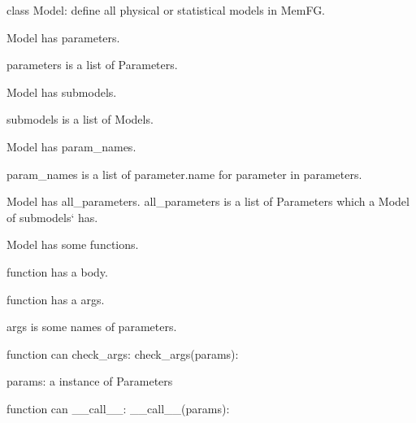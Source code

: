 \begin{DoxyItemize}
\item class {\ttfamily Model}\+: define all physical or statistical models in Mem\+FG.
\begin{DoxyItemize}
\item {\ttfamily Model} has {\ttfamily parameters}.
\begin{DoxyItemize}
\item {\ttfamily parameters} is a {\ttfamily list} of {\ttfamily Parameter}s.
\end{DoxyItemize}
\item {\ttfamily Model} has {\ttfamily submodels}.
\begin{DoxyItemize}
\item {\ttfamily submodels} is a {\ttfamily list} of {\ttfamily Model}s.
\end{DoxyItemize}
\item {\ttfamily Model} has {\ttfamily param\+\_\+names}.
\begin{DoxyItemize}
\item {\ttfamily param\+\_\+names} is a list of parameter.\+name for parameter in parameters.
\end{DoxyItemize}
\item {\ttfamily Model} has {\ttfamily all\+\_\+parameters}. {\ttfamily all\+\_\+parameters} is a list of {\ttfamily Parameter}s which a {\ttfamily Model} of submodels` has.
\item {\ttfamily Model} has some {\ttfamily function}s.
\begin{DoxyItemize}
\item {\ttfamily function} has a {\ttfamily body}.
\item {\ttfamily function} has a {\ttfamily args}.
\begin{DoxyItemize}
\item {\ttfamily args} is some {\ttfamily names} of {\ttfamily parameters}.
\end{DoxyItemize}
\item {\ttfamily function} can {\ttfamily check\+\_\+args}\+: {\ttfamily check\+\_\+args(params)}\+:
\begin{DoxyItemize}
\item params\+: a instance of {\ttfamily Parameters}
\end{DoxyItemize}
\item {\ttfamily function} can {\ttfamily \+\_\+\+\_\+call\+\_\+\+\_\+}\+: {\ttfamily \+\_\+\+\_\+call\+\_\+\+\_\+(params)}\+:
\begin{DoxyItemize}

\end{DoxyItemize}
\end{DoxyItemize}
\end{DoxyItemize}
\end{DoxyItemize}

